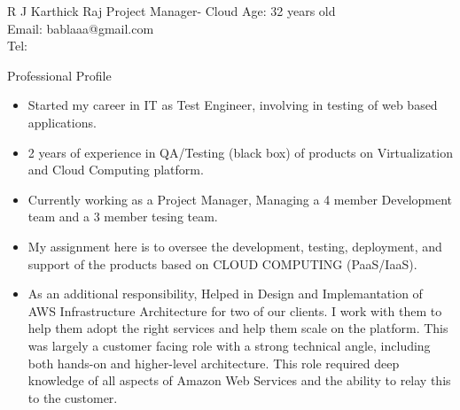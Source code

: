 \documentclass[a4paper,12pt]{article}
\begin{document}
\setmainfont



\vspace*{3\baselineskip}

\header
{R J Karthick Raj}
{Project Manager- Cloud}
{Age: 32 years old\\
Email: bablaaa@gmail.com\\
Tel: }
\newline
\newline

\begin{resumesummary}{Professional Profile}
\begin{itemize}      
  \item Started my career in IT as Test Engineer, involving in testing of web based applications.
  \item 2 years of experience in QA/Testing (black box) of products on Virtualization and Cloud Computing platform.
  \item Currently working as a Project Manager, Managing a 4 member Development team and a 3 member tesing team.
  \item My assignment here is to oversee the development, testing, deployment, and support of the products based on CLOUD COMPUTING (PaaS/IaaS). 
  \item As an additional responsibility, Helped in Design and Implemantation of AWS Infrastructure Architecture for two of our clients. I work with them to 
help them adopt the right services and help them scale on the platform. This was largely a customer facing role with a strong technical angle, including both hands-on and higher-level architecture. This role required deep knowledge of all aspects of Amazon Web Services and the ability to relay this to the customer.
\newline
\end{itemize}
\end{resumesummary}

\end{document}
